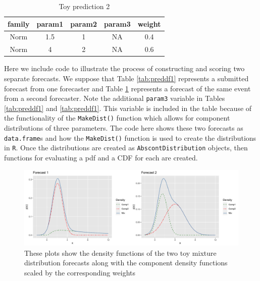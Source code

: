 \documentclass[11pt,notitlepage]{isuthesis}
\begin{document}
\begin{table}[h!]
\centering
 \begin{tabular}{|c|c|c|c|c|}
 \hline
    family & param1 & param2 & param3 & weight
    \\ \hline
    Norm & 1.5 & 1 & NA & 0.4  \\
    Norm & 4 & 2 & NA & 0.6 \\
 \hline
 \end{tabular}
 \caption[Illustrative forecast 2]{Toy prediction 2}
 \label{tab:preddf2}
\end{table}

Here we include code to illustrate the process of constructing and scoring two 
separate forecasts. We suppose that Table \ref{tab:preddf1} represents a 
submitted forecast from one forecaster and Table \ref{tab:preddf2} represents
a forecast of the same event from a second forecaster.
Note the additional \texttt{param3} variable
in Tables \ref{tab:preddf1} and \ref{tab:preddf1}. This variable is included
in the table because of the functionality of the \texttt{MakeDist()} function
which allows for component distributions of three parameters.
The code here shows these two forecasts as \texttt{data.frame}s and how the 
\texttt{MakeDist()} 
function is used to create the distributions in \texttt{R}. Once the 
distributions are created as \texttt{AbscontDistribution} objects, then 
functions for evaluating a pdf and a CDF for each are created.


\begin{Schunk}
\end{Schunk}

\begin{figure}[htbp]
\centerline{\includegraphics[scale=.15]{Images/toyfors12.png}}
\caption[Toy mixture distributions]{These plots show the density functions of
the two toy mixture distribution forecasts along with the component density
functions scaled by the corresponding weights}
\label{fig:toymixs}
\end{figure}
\end{document}

